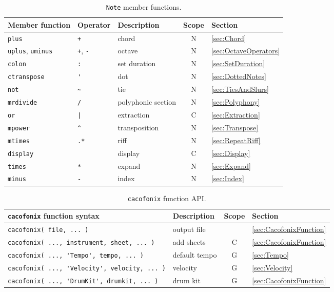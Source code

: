 \documentclass{article}
\newcommand{\note}{\lstinline!Note!\xspace}
\begin{document}
\begin{table}
	\centering
	\begin{tabular}{lllcl}
		Member function & Operator & Description & Scope & Section \\
		\hline
		\lstinline!plus! & \lstinline!+! & chord & N & \ref{sec:Chord} \\
		\lstinline!uplus!, \lstinline!uminus! & \lstinline!+!, \lstinline!-! & octave & N & \ref{sec:OctaveOperators} \\
		\lstinline!colon! & \lstinline!:! & set duration & N & \ref{sec:SetDuration} \\
		\lstinline!ctranspose! & \lstinline!'! & dot & N & \ref{sec:DottedNotes} \\
		\lstinline!not! & \lstinline!~! & tie & N & \ref{sec:TiesAndSlurs} \\
		\lstinline!mrdivide! & \lstinline!/! & polyphonic section & N & \ref{sec:Polyphony} \\
		\lstinline!or! & \lstinline!|! & extraction & C & \ref{sec:Extraction} \\
		\lstinline!mpower! & \lstinline!^! & transposition & N & \ref{sec:Transpose} \\
		\lstinline!mtimes! & \lstinline!.*! & riff & N & \ref{sec:RepeatRiff} \\
		\lstinline!display!& & display & C & \ref{sec:Display} \\
		\lstinline!times! & \lstinline!*! & expand & N & \ref{sec:Expand} \\
		\lstinline!minus! & \lstinline!-! & index & N & \ref{sec:Index} \\
	\end{tabular}
	\caption[\note member functions]{\note member functions.}
	\label{tab:NoteFunctions}
\end{table}

\begin{table}
	\centering
	\begin{tabular}{llcl}
		\lstinline!cacofonix! function syntax & Description & Scope & Section \\
		\hline
		\lstinline!cacofonix( file, ... )! & output file & & \ref{sec:CacofonixFunction} \\
		\lstinline!cacofonix( ..., instrument, sheet, ... )! & add sheets & C & \ref{sec:CacofonixFunction} \\
		\lstinline!cacofonix( ..., 'Tempo', tempo, ... )! & default tempo & G & \ref{sec:Tempo} \\
		\lstinline!cacofonix( ..., 'Velocity', velocity, ... )! & velocity & G & \ref{sec:Velocity} \\
		\lstinline!cacofonix( ..., 'DrumKit', drumkit, ... )! & drum kit & G & \ref{sec:CacofonixFunction} \\
	\end{tabular}
	\caption[\lstinline!cacofonix! function API]{\lstinline!cacofonix! function API.}
	\label{tab:CacofonixAPI}
\end{table}
\end{document}
